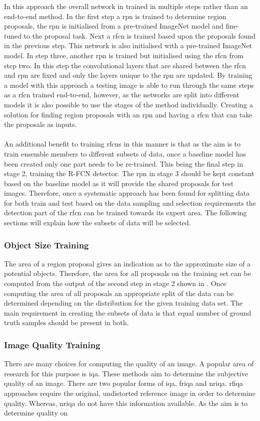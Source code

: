 In this approach the overall network in trained in multiple steps rather than an end-to-end method. In the first step a \gls{rpn} is trained to determine region proposals, the \gls{rpn} is initialised from a pre-trained ImageNet model and fine-tuned to the proposal task. Next a \gls{rfcn} is trained based upon the proposals found in the previous step. This network is also initialised with a pre-trained ImageNet model. In step three, another \gls{rpn} is trained but initialised using the \gls{rfcn} from step two. In this step the convolutional layers that are shared between the \gls{rfcn} and \gls{rpn} are fixed and only the layers unique to the \gls{rpn} are updated. By training a model with this approach a testing image is able to run through the same steps as a \gls{rfcn} trained end-to-end, however, as the networks are split into different models it is also possible to use the stages of the method individually. Creating a solution for finding region proposals with an \gls{rpn} and having a \gls{rfcn} that can take the proposals as inputs. 
\\\\
An additional benefit to training \glspl{rfcn} in this manner is that as the aim is to train ensemble members to different subsets of data, once a baseline model has been created only one part needs to be re-trained. This being the final step in stage 2, training the R-FCN detector. The \gls{rpn} in stage 3 should be kept constant based on the baseline model as it will provide the shared proposals for test images. Therefore, once a systematic approach has been found for splitting data for both train and test based on the data sampling and selection requirements the detection part of the \gls{rfcn} can be trained towards its expert area. The following sections will explain how the subsets of data will be selected.

\subsubsection{Object Size Training}
The area of a region proposal gives an indication as to the approximate size of a potential objects. Therefore, the area for all proposals on the training set can be computed from the output of the second step in stage 2 shown in . Once computing the area of all proposals an appropriate split of the data can be determined depending on the distribution for the given training data set. The main requirement in creating the subsets of data is that equal number of ground truth samples should be present in both.

\subsubsection{Image Quality Training}
There are many choices for computing the quality of an image. A popular area of research for this purpose is \gls{iqa}. These methods aim to determine the subjective quality of an image. There are two popular forms of \gls{iqa}, \gls{friqa} and \gls{nriqa}. \gls{rfiqa} approaches require the original, undistorted reference image in order to determine quality. Whereas, \gls{nriqa} do not have this information available. As the aim is to determine quality on
